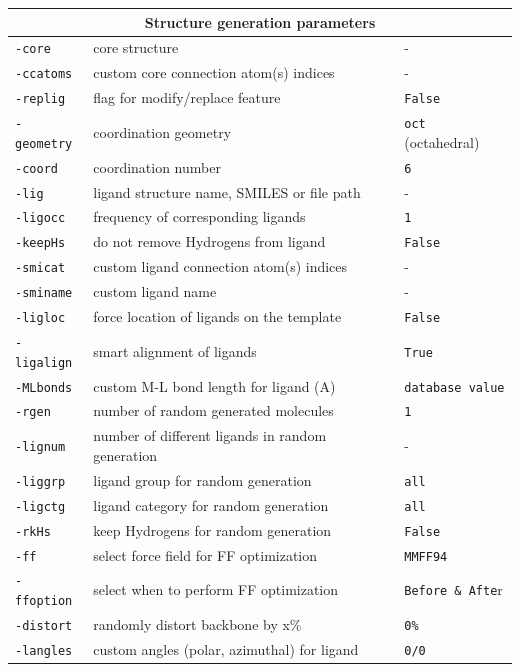 \documentclass[a4paper,12pt]{assignment}
\begin{document}
\begin{tabular}{|l|l|l|}
\hline
\multicolumn{3}{|c|}{\Large \textbf{Structure generation parameters}}\\ \hline   
\texttt{-core} & core structure  & - \\
\texttt{-ccatoms} & custom core connection atom(s) indices & - \\
\texttt{-replig} & flag for modify/replace feature & \texttt{False} \\
\texttt{-geometry} & coordination geometry & \texttt{oct} (octahedral) \\
\texttt{-coord} & coordination number & \texttt{6} \\
\texttt{-lig} & ligand structure name, SMILES  or file path& - \\
\texttt{-ligocc} &  frequency of corresponding ligands & \texttt{1} \\
\texttt{-keepHs} & do not remove Hydrogens from ligand & \texttt{False} \\
\texttt{-smicat} & custom ligand connection atom(s) indices & - \\
\texttt{-sminame} & custom ligand name  & - \\
\texttt{-ligloc} & force location of ligands on the template & \texttt{False} \\
\texttt{-ligalign} & smart alignment of ligands  & \texttt{True} \\
\texttt{-MLbonds} & custom M-L bond length for ligand (A)  & \texttt{database value} \\
\texttt{-rgen} & number of random generated molecules & \texttt{1} \\
\texttt{-lignum} & number of different ligands in random generation & - \\
\texttt{-liggrp} & ligand group for random generation & \texttt{all} \\
\texttt{-ligctg} & ligand category for random generation & \texttt{all} \\
\texttt{-rkHs} & keep Hydrogens for random generation & \texttt{False} \\
\texttt{-ff} & select force field for FF optimization & \texttt{MMFF94} \\
\texttt{-ffoption} & select when to perform FF optimization & \texttt{Before \& Afte}r \\
\texttt{-distort} & randomly distort backbone by x\% & \texttt{0\%} \\
\texttt{-langles} & custom angles (polar, azimuthal) for ligand & \texttt{0/0} \\
\hline
\end{tabular}
\end{document}
